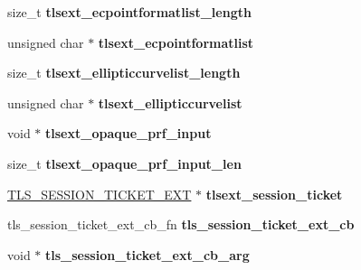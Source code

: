 \begin{DoxyCompactItemize}
\item 
\hypertarget{structssl__st_a1661bf580598984c531b321c0a005d37}{}size\+\_\+t {\bfseries tlsext\+\_\+ecpointformatlist\+\_\+length}\label{structssl__st_a1661bf580598984c531b321c0a005d37}

\item 
\hypertarget{structssl__st_a000e3639718d5d28e610cca71c0ee995}{}unsigned char $\ast$ {\bfseries tlsext\+\_\+ecpointformatlist}\label{structssl__st_a000e3639718d5d28e610cca71c0ee995}

\item 
\hypertarget{structssl__st_ac0a9a07be2d0e0f83b0844b61e82d06f}{}size\+\_\+t {\bfseries tlsext\+\_\+ellipticcurvelist\+\_\+length}\label{structssl__st_ac0a9a07be2d0e0f83b0844b61e82d06f}

\item 
\hypertarget{structssl__st_af2e7ed3a280b3afb8d42ea9f9aa45637}{}unsigned char $\ast$ {\bfseries tlsext\+\_\+ellipticcurvelist}\label{structssl__st_af2e7ed3a280b3afb8d42ea9f9aa45637}

\item 
\hypertarget{structssl__st_a25e40e842200910b02ec2191da0f5f62}{}void $\ast$ {\bfseries tlsext\+\_\+opaque\+\_\+prf\+\_\+input}\label{structssl__st_a25e40e842200910b02ec2191da0f5f62}

\item 
\hypertarget{structssl__st_a83b5b006619d33cb3bd36b0b03288e9f}{}size\+\_\+t {\bfseries tlsext\+\_\+opaque\+\_\+prf\+\_\+input\+\_\+len}\label{structssl__st_a83b5b006619d33cb3bd36b0b03288e9f}

\item 
\hypertarget{structssl__st_a88b1275f3d5733e3e856fe8c09d18566}{}\hyperlink{structtls__session__ticket__ext__st}{T\+L\+S\+\_\+\+S\+E\+S\+S\+I\+O\+N\+\_\+\+T\+I\+C\+K\+E\+T\+\_\+\+E\+X\+T} $\ast$ {\bfseries tlsext\+\_\+session\+\_\+ticket}\label{structssl__st_a88b1275f3d5733e3e856fe8c09d18566}

\item 
\hypertarget{structssl__st_adfbd96d1abce945f541c432379fc994f}{}tls\+\_\+session\+\_\+ticket\+\_\+ext\+\_\+cb\+\_\+fn {\bfseries tls\+\_\+session\+\_\+ticket\+\_\+ext\+\_\+cb}\label{structssl__st_adfbd96d1abce945f541c432379fc994f}

\item 
\hypertarget{structssl__st_a45dd63c101fc5b96773ab292285962a4}{}void $\ast$ {\bfseries tls\+\_\+session\+\_\+ticket\+\_\+ext\+\_\+cb\+\_\+arg}\label{structssl__st_a45dd63c101fc5b96773ab292285962a4}


\end{DoxyCompactItemize}
